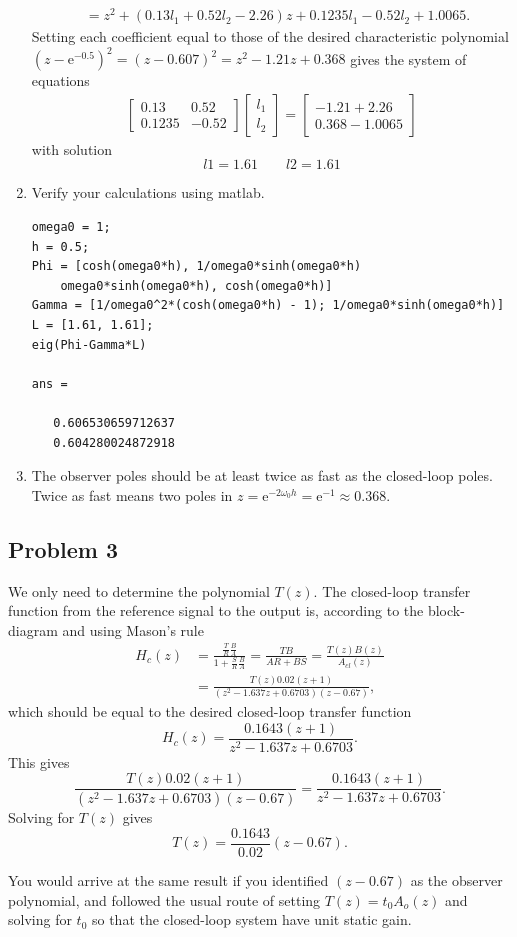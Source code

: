 \documentclass[letterpaper,12pt]{article}
\newcommand{\bbm}{\begin{bmatrix}}
\newcommand{\ebm}{\end{bmatrix}}
\newcommand*{\mexp}[1]{\ensuremath{\mathrm{e}^{#1}}}
\begin{document}
\begin{enumerate}
\begin{equation*}
\begin{aligned}
      &= z^2 + (0.13l_1 + 0.52l_2 - 2.26)z + 0.1235l_1 - 0.52l_2 + 1.0065.
    \end{aligned}
  \end{equation*}
  Setting each coefficient equal to those of the desired characteristic polynomial \((z-\mexp{-0.5})^2 = (z-0.607)^2 = z^2 - 1.21z + 0.368\) gives the system of equations
  \begin{equation*}
    \begin{aligned}
      \bbm 0.13 & 0.52\\0.1235 & -0.52 \ebm \bbm l_1\\l_2 \ebm = \bbm -1.21 + 2.26\\0.368-1.0065 \ebm
    \end{aligned}
  \end{equation*}
  with solution
  \[ l1 =  1.61 \qquad l2= 1.61 \]
\item Verify your calculations using matlab. 
  \begin{verbatim}
omega0 = 1;
h = 0.5;
Phi = [cosh(omega0*h), 1/omega0*sinh(omega0*h)
    omega0*sinh(omega0*h), cosh(omega0*h)]
Gamma = [1/omega0^2*(cosh(omega0*h) - 1); 1/omega0*sinh(omega0*h)]
L = [1.61, 1.61];
eig(Phi-Gamma*L)

ans =

   0.606530659712637
   0.604280024872918
\end{verbatim}
\item The observer poles should be at least twice as fast as the closed-loop poles. Twice as fast means two poles in \(z = \mexp{-2\omega_0 h} = \mexp{-1} \approx 0.368\). 
\end{enumerate}

\subsection*{Problem 3}

We only need to determine the polynomial \(T(z)\). The closed-loop transfer function from the reference signal to the output is, according to the block-diagram and using Mason's rule
\begin{equation*}
  \begin{aligned}
    H_c(z) &= \frac{ \frac{T}{R} \frac{B}{A} }{1 + \frac{S}{R} \frac{B}{A}} = \frac{ TB}{AR + BS} = \frac{T(z)B(z)}{A_{cl}(z)}\\
    &= \frac{T(z)0.02(z+1)}{(z^2 - 1.637z + 0.6703)(z-0.67)},
  \end{aligned}
\end{equation*}
which should be equal to the desired closed-loop transfer function
\[H_c(z) = \frac{0.1643(z+1)}{z^2 - 1.637z + 0.6703}. \]
This gives
\[ \frac{T(z)0.02(z+1)}{(z^2 - 1.637z + 0.6703)(z-0.67)} = \frac{0.1643(z+1)}{z^2 - 1.637z + 0.6703}. \]
Solving for \(T(z)\) gives
\[ T(z) = \frac{0.1643}{0.02}(z-0.67).\]

You would arrive at the same result if you identified \((z-0.67)\) as the observer polynomial, and followed the usual route of setting \(T(z) = t_0A_o(z)\) and solving for \(t_0\) so that the closed-loop system have unit static gain.
\end{document}
